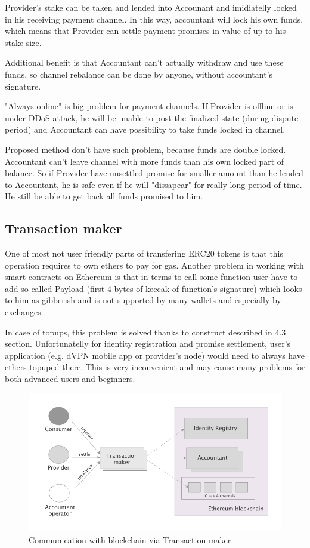 \documentclass[a4paper,12pt]{article}
\begin{document}
Provider's stake can be taken and lended into Accounant and imidiatelly locked 
in his receiving payment channel. In this way, accountant will lock his own 
funds, which means that Provider can settle payment promises in value of up to 
his stake size.

Additional benefit is that Accountant can't actually withdraw and use these 
funds, so channel rebalance can be done by anyone, without accountant's 
signature.

"Always online" is big problem for payment channels. If Provider is offline or 
is under DDoS attack, he will be unable to post the finalized state (during 
dispute period) and Accountant can have possibility to take funds locked in 
channel.

Proposed method don't have such problem, because funds are double locked. 
Accountant can't leave channel with more funds than his own locked part of 
balance. So if Provider have unsettled promise for smaller amount than he 
lended to Accountant, he is safe even if he will "dissapear" for really long 
period of time. He still be able to get back all funds promised to him.

\subsection{Transaction maker}

One of most not user friendly parts of transfering ERC20 tokens is that this
operation requires to own ethers to pay for gas. Another problem in working 
with smart contracts on Ethereum is that in terms to call some function user 
have to add so called Payload (first 4 bytes of keccak of function's signature) 
which looks to him as gibberish and is not supported by many wallets and 
especially by exchanges. 

In case of topups, this problem is solved thanks to construct described in 4.3
section. Unfortunatelly for identity registration and promise settlement, user's 
application (e.g. dVPN mobile app or provider's node) would need to always have 
ethers topuped there. This is very inconvenient and may cause many problems for
both advanced users and beginners.

\begin{figure}[H]
    \centering
    \includegraphics[scale=0.45]{../img/transactor}
    \caption{Communication with blockchain via Transaction maker}
    \label{img:transactor}
\end{figure}
\end{document}
